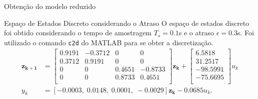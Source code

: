 \documentclass[10pt]{beamer}
\newcommand\Fontvii{\fontsize{7}{8.2}\selectfont}
\begin{document}
\begin{frame}[fragile]{Obtenção do modelo reduzido}
\begin{block}{Espaço de Estados Discreto considerando o Atraso}
O espaço de estados discreto foi obtido considerando o tempo de amostragem $T_s = 0.1$s e o atraso $\epsilon = 0.3$s. Foi utilizado o comando \texttt{c2d} do MATLAB para se obter a discretização.
\Fontvii
\begin{align}
\mathbf{z_{k+1}} &= \left[\begin{array}{cccc}
	0.9191&   -0.3712&         0&         0\\
    0.3712&    0.9191&         0&         0\\
         0&         0&    0.4651&   -0.8733\\
         0&         0&    0.8733&    0.4651\\
 \end{array}\right]\mathbf{z_k} + \left[\begin{array}{c}
	6.5818\\
	   31.2517\\
	  -98.5991\\
	  -75.6695\\
	 \end{array}\right]u_k \\
y_k &= \left[-0.0003,\;0.0148,\;0.0001,\;-0.0029\right]\mathbf{z_k} - 0.0685 u_k.
\end{align}
\end{block}
\end{frame}
\end{document}
